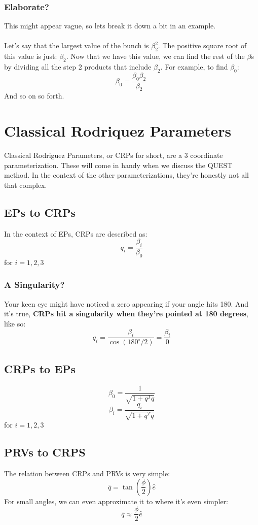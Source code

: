 \documentclass[a4paper,14pt]{extreport}
\begin{document}
\subsection{Elaborate?}
This might appear vague, so lets break it down a bit in an example.\\\\Let's say that the largest value of the bunch is 
\(\beta_2^2\). The positive square root of this value is just: \(\beta_2\). Now that we have this value, we can find the rest of the $\beta$s by dividing all the step 2 products that include $\beta_2$. For example, to find $\beta_0$:
\[
\beta_0=\dfrac{\beta_0\beta_2}{\beta_2}\
\]
And so on so forth.

\chapter{Classical Rodriquez Parameters}
Classical Rodriguez Parameters, or CRPs for short, are a 3 coordinate parameterization. These will come in handy when we discuss the QUEST method. In the context of the other parameterizations, they're honestly not all that complex.
\section{EPs to CRPs}
In the context of EPs, CRPs are described as:
\[
q_i = \dfrac{\beta_i}{\beta_0}
\]
for \(i=1,2,3\)
\subsection{A Singularity?}
Your keen eye might have noticed a zero appearing if your angle hits 180. And it's true, \textbf{CRPs hit a singularity when they're pointed at 180 degrees}, like so:
\[
q_i = \dfrac{\beta_i}{\cos(180^{\circ}/2)} = \dfrac{\beta_i}{0}
\]
\section{CRPs to EPs}
\[
\beta_0 = \dfrac{1}{\sqrt{1+q^Tq}}
\]
\[
\beta_i = \dfrac{q_i}{\sqrt{1+q^Tq}}
\]
for \(i=1,2,3\)
\section{PRVs to CRPS}
The relation between CRPs and PRVs is very simple:
\[
\bar{q} = \tan{(\dfrac{\phi}{2})}\hat{e}
\]
For small angles, we can even approximate it to where it's even simpler:
\[
\bar{q} \approx \dfrac{\phi}{2}\hat{e}
\]
\end{document}
